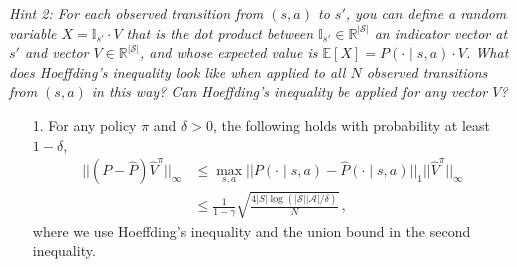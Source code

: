 \emph{Hint 2: For each observed transition from $(s, a)$ to $s'$, you can define a random variable $X = \mathbb{I}_{s'} \cdot V$ that is the dot product between $\mathbb{I}_{s'} \in \mathbb{R}^{|\mathcal{S}|}$ an indicator vector at $s'$ and vector $V \in \mathbb{R}^{|\mathcal{S}|}$, and whose expected value is $\mathbb{E}[X] = P(\cdot \mid s, a) \cdot V$. What does Hoeffding's inequality look like when applied to all $N$ observed transitions from $(s, a)$ in this way? Can Hoeffding's inequality be applied for any vector $V$?}
\begin{itemize}[leftmargin=0.2in]
    \item[1.] For any policy $\pi$ and $\delta > 0$, the following holds with probability at least $1 - \delta$,
    \begin{align*}
    ||(P - \widehat{P}) \widehat{V}^\pi||_{\infty}
    &\leq 
    \max_{s, a} ||P(\cdot \mid s, a) - \widehat{P}(\cdot \mid s, a)||_{1} ||\widehat{V}^\pi||_{\infty} \\
    &\leq 
    \frac{1}{1 - \gamma} \sqrt{\frac{4|S| \log (|\mathcal{S}||\mathcal{A}|/\delta)}{N}}\,,
    \end{align*}
    where we use Hoeffding's inequality and the union bound in the second inequality.
    

\end{itemize}
